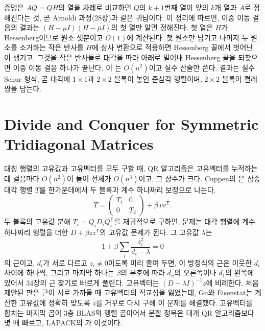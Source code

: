 증명은 $AQ=QH$의 열을 차례로 비교하면 $Q$의 $k+1$번째 열이 앞의 $k$개 열과 $A$로 정해진다는 것, 곧 Arnoldi 과정(28장)과 같은 귀납이다\cite{golub2013matrix}. 이 정리에 따르면, 이중 이동 걸음의 결과는 $(H-\mu I)(H-\bar\mu I)$의 첫 열만 알면 정해진다. 첫 열은 $H$가 Hessenberg이므로 원소 셋뿐이고 $O(1)$에 계산된다. 첫 원소만 남기고 나머지 두 원소를 소거하는 작은 반사를 $H$에 상사 변환으로 적용하면 Hessenberg 꼴에서 벗어난 이 생기고, 그것을 작은 반사들로 대각을 따라 아래로 밀어내 Hessenberg 꼴을 되찾으면 이중 이동 걸음 하나가 끝난다. 이 는 $O(n^2)$이고 실수 산술만 쓴다\cite{francis1962,watkins2011francis}. 결과는 실수 Schur 형식, 곧 대각에 $1\times1$과 $2\times2$ 블록이 놓인 준삼각 행렬이며, $2\times2$ 블록이 켤레 쌍을 담는다.

\section{Divide and Conquer for Symmetric Tridiagonal Matrices}
\label{sec:divide-conquer}

대칭 행렬의 고유값과 고유벡터를 모두 구할 때, QR 알고리즘은 고유벡터를 누적하는 데 걸음마다 $O(n^2)$이 들어 전체가 $O(n^3)$이고, 그 상수가 크다. Cuppen의 은 삼중대각 행렬 $T$를 한가운데에서 두 블록과 계수 하나짜리 보정으로 나눈다\cite{cuppen1981}.
\[
T=\begin{pmatrix}T_1&0\\0&T_2\end{pmatrix}+\beta\,vv^{\mathsf T}.
\]
두 블록의 고유값 분해 $T_i=Q_iD_iQ_i^{\mathsf T}$를 재귀적으로 구하면, 문제는 대각 행렬에 계수 하나짜리 행렬을 더한 $D+\beta zz^{\mathsf T}$의 고유값 문제가 된다. 그 고유값 $\lambda$는 
\[
1+\beta\sum_i\frac{z_i^2}{d_i-\lambda}=0
\]
의 근이고, $d_i$가 서로 다르고 $z_i\ne0$이도록 미리 줄여 두면, 이 방정식의 근은 이웃한 $d_i$ 사이에 하나씩, 그리고 마지막 하나는 $\beta$의 부호에 따라 $d_n$의 오른쪽이나 $d_1$의 왼쪽에 있어서 34장의 근 찾기로 빠르게 풀린다. 고유벡터는 $(D-\lambda I)^{-1}z$에 비례한다. 처음 제안된 판은 근이 서로 가까울 때 고유벡터의 직교성을 잃었는데, Gu와 Eisenstat는 계산한 고유값에 정확히 맞도록 $z$를 거꾸로 다시 구해 이 문제를 해결했다\cite{gu1995}. 고유벡터를 합치는 마지막 곱이 3층 BLAS의 행렬 곱이어서 분할 정복은 대개 QR 알고리즘보다 몇 배 빠르고, LAPACK의 가 이것이다.

